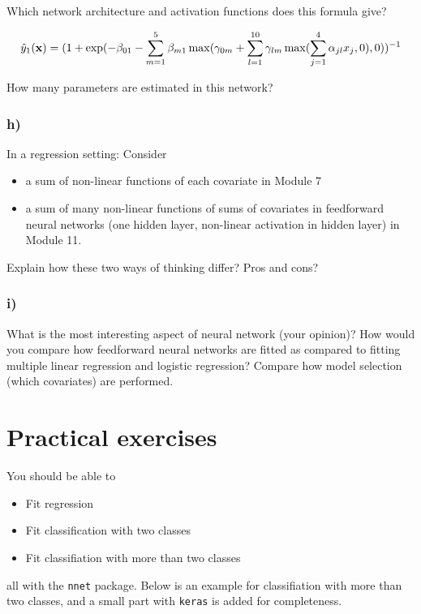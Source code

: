 \documentclass[]{article}
\providecommand{\tightlist}{%
  \setlength{\itemsep}{0pt}\setlength{\parskip}{0pt}}
\begin{document}
Which network architecture and activation functions does this formula
give?

\[ \hat{y}_1({\bf x})=(1+\exp(-\beta_{01}-\sum_{m=1}^5 \beta_{m1}\max(\gamma_{0m}+\sum_{l=1}^{10} \gamma_{lm}\max(\sum_{j=1}^{4}\alpha_{jl}x_j,0),0))^{-1}\]

How many parameters are estimated in this network?

\subsubsection{h)}\label{h}

In a regression setting: Consider

\begin{itemize}
\tightlist
\item
  a sum of non-linear functions of each covariate in Module 7
\item
  a sum of many non-linear functions of sums of covariates in
  feedforward neural networks (one hidden layer, non-linear activation
  in hidden layer) in Module 11.
\end{itemize}

Explain how these two ways of thinking differ? Pros and cons?

\subsubsection{i)}\label{i}

What is the most interesting aspect of neural network (your opinion)?
How would you compare how feedforward neural networks are fitted as
compared to fitting multiple linear regression and logistic regression?
Compare how model selection (which covariates) are performed.

\section{Practical exercises}\label{practical-exercises}

You should be able to

\begin{itemize}
\tightlist
\item
  Fit regression
\item
  Fit classification with two classes
\item
  Fit classifiation with more than two classes
\end{itemize}

all with the \texttt{nnet} package. Below is an example for
classifiation with more than two classes, and a small part with
\texttt{keras} is added for completeness.
\end{document}
